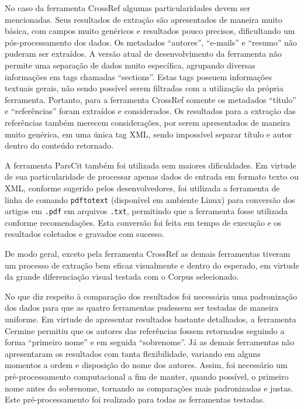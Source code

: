 No caso da ferramenta CrossRef algumas particularidades devem ser mencionadas. Seus resultados de extração são apresentados de maneira muito básica, com campos muito genéricos e resultados pouco precisos, dificultando um pós-processamento dos dados. Os metadados ``autores'', ``e-mails'' e ``resumo'' não puderam ser extraídos. A versão atual de desenvolvimento da ferramenta não permite uma separação de dados muito específica, agrupando diversas informações em tags chamadas ``sections''. Estas tags possuem informações textuais gerais, não sendo possível serem filtradas com a utilização da própria ferramenta. Portanto, para a ferramenta CrossRef somente os metadados ``título'' e ``referências'' foram extraídos e considerados. Os resultados para a extração das referências também merecem considerações, por serem apresentados de maneira muito genérica, em uma única tag XML, sendo impossível separar título e autor dentro do conteúdo retornado.

A ferramenta ParsCit também foi utilizada sem maiores dificuldades. Em virtude de sua particularidade de processar apenas dados de entrada em formato texto ou XML, conforme sugerido pelos desenvolvedores, foi utilizada a ferramenta de linha de comando \texttt{pdftotext} (disponível em ambiente Linux) para conversão dos artigos em \texttt{.pdf} em arquivos \texttt{.txt}, permitindo que a ferramenta fosse utilizada conforme recomendações. Esta conversão foi feita em tempo de execução e os resultados coletados e gravados com sucesso.

De modo geral, exceto pela ferramenta CrossRef as demais ferramentas tiveram um processo de extração bem eficaz visualmente e dentro do esperado, em virtude da grande diferenciação visual testada com o Corpus selecionado. 


No que diz respeito à comparação dos resultados foi necessária uma padronização dos dados para que as quatro ferramentas pudessem ser testadas de maneira uniforme. Em virtude de apresentar resultados bastante detalhados, a ferramenta Cermine permitiu que os autores das referências fossem retornados seguindo a forma ``primeiro nome'' e em seguida ``sobrenome''. Já as demais ferramentas não apresentaram os resultados com tanta flexibilidade, variando em alguns momentos a ordem e disposição do nome dos autores. Assim, foi necessário um pré-processamento computacional a fim de manter, quando possível, o primeiro nome antes do sobrenome, tornando as comparações mais padronizadas e justas. Este pré-processamento foi realizado para todas as ferramentas testadas.

